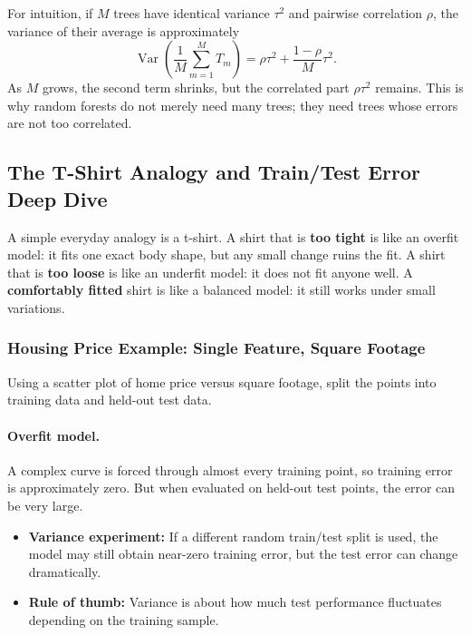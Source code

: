 \documentclass[12pt,openany]{book}
\begin{document}
For intuition, if \(M\) trees have identical variance \(\tau^2\) and pairwise correlation \(\rho\), the variance of their average is approximately
\begin{equation*}
    \operatorname{Var}\!\left(\frac{1}{M}\sum_{m=1}^{M} T_m\right)
    = \rho\tau^2 + \frac{1-\rho}{M}\tau^2.
\end{equation*}
As \(M\) grows, the second term shrinks, but the correlated part \(\rho\tau^2\) remains. This is why random forests do not merely need many trees; they need trees whose errors are not too correlated.

\subsection{The T-Shirt Analogy and Train/Test Error Deep Dive}

A simple everyday analogy is a t-shirt. A shirt that is \textbf{too tight} is like an overfit model: it fits one exact body shape, but any small change ruins the fit. A shirt that is \textbf{too loose} is like an underfit model: it does not fit anyone well. A \textbf{comfortably fitted} shirt is like a balanced model: it still works under small variations.

\subsubsection{Housing Price Example: Single Feature, Square Footage}

Using a scatter plot of home price versus square footage, split the points into training data and held-out test data.

\paragraph{Overfit model.}
A complex curve is forced through almost every training point, so training error is approximately zero. But when evaluated on held-out test points, the error can be very large.

\begin{itemize}[leftmargin=*]
    \item \textbf{Variance experiment:} If a different random train/test split is used, the model may still obtain near-zero training error, but the test error can change dramatically.
    \item \textbf{Rule of thumb:} Variance is about how much test performance fluctuates depending on the training sample.
\end{itemize}
\end{document}
